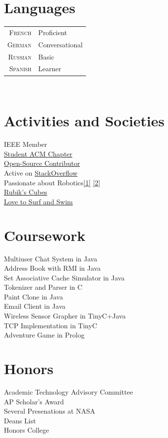 \documentclass[10pt]{article}
\begin{document}
\begin{minipage}[t]{0.44\textwidth}
\section{Languages}
\begin{tabular}{rl}
   \textsc{French}   &  Proficient\\
   \textsc{German}   &  Conversational\\
   \textsc{Russian}  &  Basic\\
   \textsc{Spanish}  &  Learner\\
\end{tabular}\\[5pt]

\section{Activities and Societies}
   IEEE Member\\
   \href{http://polaris.cs.wcu.edu/~acm/}{Student ACM Chapter}\\
   \href{https://github.com/ranman}{Open-Source Contributor}\\
   Active on \href{http://stackoverflow.com/users/240004/ranman}
   {StackOverflow}\\
   Passionate about Robotics\href{http://robotics.punahou.edu/}{[1]}
   \href{http://irg.arc.nasa.gov}{[2]}\\
   \href{http://www.youtube.com/user/ranman96734}{Rubik's Cubes}\\
   \href{http://www.punahouaquatics.org/Home.jsp?team=hipaq}
   {Love to Surf and Swim}\\
\section{Coursework}
   Multiuser Chat System in Java\\
   Address Book with RMI in Java\\
   Set Associative Cache Simulator in Java\\
   Tokenizer and Parser in C\\
   Paint Clone in Java\\
   Email Client in Java\\
   Wireless Sensor Grapher in TinyC+Java\\
   TCP Implementation in TinyC\\
   Adventure Game in Prolog\\
\section{Honors}
   Academic Technology Advisory Committee\\
   AP Scholar's Award\\
   Several Presenations at NASA\\
   Deans List\\
   Honors College\\
\end{minipage}
\end{document}
